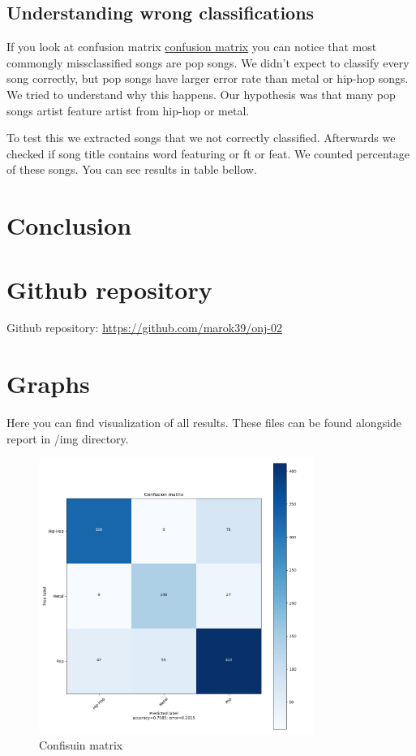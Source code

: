 \documentclass[a4paper,11pt]{article}
\begin{document}
\subsection{Understanding wrong classifications}

If you look at confusion matrix \hyperref[label-cf-matrix]{confusion matrix} you can notice that most commongly missclassified songs are pop songs. We didn't expect to classify every song correctly, but pop songs have larger error rate than metal or hip-hop songs. We tried to understand why this happens. Our hypothesis was that many pop songs artist feature artist from hip-hop or metal.

To test this we extracted songs that we not correctly classified. Afterwards we checked if song title contains word featuring or ft or feat. We counted percentage of these songs. You can see results in table bellow.


\section{Conclusion}


\section{Github repository}
Github repository: \href{https://github.com/marok39/onj-02}{https://github.com/marok39/onj-02}

\pagebreak
\appendix
\appendixpage
\section{\label{label-graphs} Graphs}

Here you can find visualization of all results. These files can be found alongside report in /img directory.

\begin{figure}[h]
\begin{center}
\includegraphics[width=0.8\textwidth]{./img/matrix.png}
\end{center}
\caption{Confisuin matrix}
\label{label-cf-matrix}
\end{figure}
\end{document}
